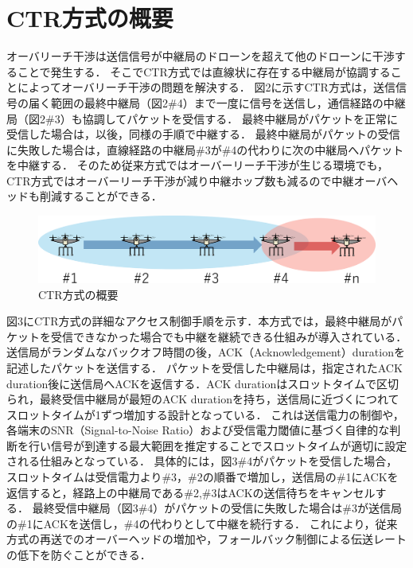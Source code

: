 \documentclass[a4paper,10pt]{ltjsarticle}
\begin{document}
\section{CTR方式の概要}
オーバリーチ干渉は送信信号が中継局のドローンを超えて他のドローンに干渉することで発生する．
そこでCTR方式では直線状に存在する中継局が協調することによってオーバリーチ干渉の問題を解決する．
図2に示すCTR方式は，送信信号の届く範囲の最終中継局（図2\#4）まで一度に信号を送信し，通信経路の中継局（図2\#3）も協調してパケットを受信する．
最終中継局がパケットを正常に受信した場合は，以後，同様の手順で中継する．
最終中継局がパケットの受信に失敗した場合は，直線経路の中継局\#3が\#4の代わりに次の中継局へパケットを中継する．
そのため従来方式ではオーバーリーチ干渉が生じる環境でも，CTR方式ではオーバーリーチ干渉が減り中継ホップ数も減るので中継オーバヘッドも削減することができる．
\begin{figure}[H]
  \centering
  \includegraphics[width=\linewidth]{fig2.pdf} 
  \caption{CTR方式の概要}

\end{figure}
図3にCTR方式の詳細なアクセス制御手順を示す．本方式では，最終中継局がパケットを受信できなかった場合でも中継を継続できる仕組みが導入されている．
送信局がランダムなバックオフ時間の後，ACK（Acknowledgement）durationを記述したパケットを送信する．
パケットを受信した中継局は，指定されたACK duration後に送信局へACKを返信する．ACK durationはスロットタイムで区切られ，最終受信中継局が最短のACK durationを持ち，送信局に近づくにつれてスロットタイムが1ずつ増加する設計となっている．
これは送信電力の制御や，各端末のSNR（Signal-to-Noise Ratio）および受信電力閾値に基づく自律的な判断を行い信号が到達する最大範囲を推定することでスロットタイムが適切に設定される仕組みとなっている．
具体的には，図3\#4がパケットを受信した場合，スロットタイムは受信電力より\#3，\#2の順番で増加し，送信局の\#1にACKを返信すると，経路上の中継局である\#2,\#3はACKの送信待ちをキャンセルする．
最終受信中継局（図3\#4）がパケットの受信に失敗した場合は\#3が送信局の\#1にACKを送信し，\#4の代わりとして中継を続行する．
これにより，従来方式の再送でのオーバーヘッドの増加や，フォールバック制御による伝送レートの低下を防ぐことができる．
\end{document}
